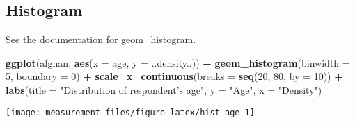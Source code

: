 \documentclass[]{book}
\newenvironment{Shaded}{\begin{snugshade}}{\end{snugshade}}
\newcommand{\KeywordTok}[1]{\textcolor[rgb]{0.13,0.29,0.53}{\textbf{#1}}}
\newcommand{\DataTypeTok}[1]{\textcolor[rgb]{0.13,0.29,0.53}{#1}}
\newcommand{\DecValTok}[1]{\textcolor[rgb]{0.00,0.00,0.81}{#1}}
\newcommand{\FloatTok}[1]{\textcolor[rgb]{0.00,0.00,0.81}{#1}}
\newcommand{\StringTok}[1]{\textcolor[rgb]{0.31,0.60,0.02}{#1}}
\newcommand{\OperatorTok}[1]{\textcolor[rgb]{0.81,0.36,0.00}{\textbf{#1}}}
\newcommand{\NormalTok}[1]{#1}
\theoremstyle{definition}
\theoremstyle{definition}
\theoremstyle{definition}
\theoremstyle{remark}
\begin{document}
\subsection{Histogram}\label{histogram}

See the documentation for
\href{https://www.rdocumentation.org/packages/ggplot2/topics/geom_histogram}{geom\_histogram}.

\begin{Shaded}
\begin{Highlighting}[]
\KeywordTok{ggplot}\NormalTok{(afghan, }\KeywordTok{aes}\NormalTok{(}\DataTypeTok{x =}\NormalTok{ age, }\DataTypeTok{y =}\NormalTok{ ..density..)) }\OperatorTok{+}
\StringTok{  }\KeywordTok{geom_histogram}\NormalTok{(}\DataTypeTok{binwidth =} \DecValTok{5}\NormalTok{, }\DataTypeTok{boundary =} \DecValTok{0}\NormalTok{) }\OperatorTok{+}
\StringTok{  }\KeywordTok{scale_x_continuous}\NormalTok{(}\DataTypeTok{breaks =} \KeywordTok{seq}\NormalTok{(}\DecValTok{20}\NormalTok{, }\DecValTok{80}\NormalTok{, }\DataTypeTok{by =} \DecValTok{10}\NormalTok{)) }\OperatorTok{+}
\StringTok{  }\KeywordTok{labs}\NormalTok{(}\DataTypeTok{title =} \StringTok{"Distribution of respondent's age"}\NormalTok{,}
       \DataTypeTok{y =} \StringTok{"Age"}\NormalTok{, }\DataTypeTok{x =} \StringTok{"Density"}\NormalTok{)}
\end{Highlighting}
\end{Shaded}

\begin{center}\texttt{[image: measurement\_files/figure-latex/hist\_age-1]} \end{center}

\begin{Shaded}
\end{Shaded}
\end{document}
